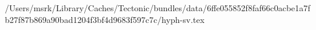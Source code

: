 /Users/msrk/Library/Caches/Tectonic/bundles/data/6ffe055852f8faf66c0acbe1a7fb27f87b869a90bad1204f3bf4d9683f597c7c/hyph-sv.tex